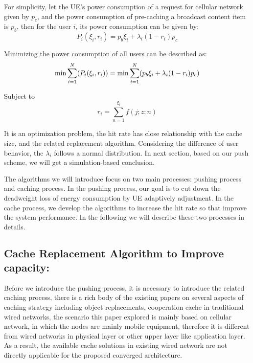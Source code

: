 \documentclass[conference]{IEEEtran}
\begin{document}
For simplicity, let the UE's power consumption of a request for cellular network given by $p_c$, and the power consumption of pre-caching a broadcast content item is $p_b$, then for the user $i$, its power consumption can be given by:
\begin{dmath}
P_i(\xi_i,r_i)=p_b\xi_i+ \lambda_i(1-r_i)p_c
\end{dmath}

Minimizing the power consumption of all users can be described as:
\begin{dmath}
 \min \sum_{i=1}^{N} (P_i(\xi_i,r_i))=
 \min \sum_{i=1}^{N}(p_b\xi_i+ \lambda_i(1-r_i)p_c)\\
 \end{dmath}

 Subject to
 \begin{dmath}
 r_i=\sum_{n=1}^{\xi_i} f(j;z;n)
 \end{dmath}

It is an optimization problem, the hit rate has close relationship with the cache size, and the related replacement algorithm. Considering the difference of user behavior, the $\lambda_i$ follows a normal distribution. In next section, based on our push scheme, we will get a simulation-based conclusion.  
 
The algorithms we will introduce focus on two main processes: pushing process and caching process. In the pushing process, our goal is to cut down the deadweight loss of energy consumption by UE adaptively adjustment. In the cache process, we develop the algorithms to increase the hit rate so that improve the system performance. In the following we will describe these two processes in details.    
 
  
\subsection{Cache Replacement Algorithm to Improve capacity:}
Before we introduce the pushing process, it is necessary to introduce the related caching process, there is a rich body of the existing papers on several aspects of  caching strategy including object replacements, cooperation cache in traditional wired networks\cite{kumar2014cache}, the scenario this paper explored is mainly based on cellular network,
in which the nodes are mainly mobile equipment, therefore it is different from wired networks in physical layer or other upper layer like application layer. As a result, the available cache solutions in existing wired network are not directly applicable for the proposed converged architecture.
        
\end{document}
